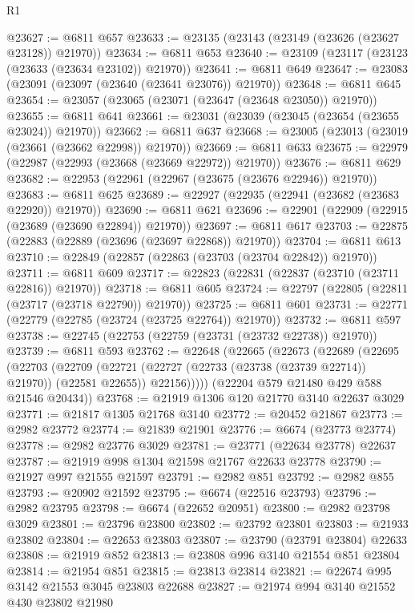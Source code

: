 \begin{lexlean}{R1}
\begin{coremodule}
@23627 := @6811 @657
@23633 := @23135 (@23143 (@23149 (@23626 (@23627 @23128)) @21970))
@23634 := @6811 @653
@23640 := @23109 (@23117 (@23123 (@23633 (@23634 @23102)) @21970))
@23641 := @6811 @649
@23647 := @23083 (@23091 (@23097 (@23640 (@23641 @23076)) @21970))
@23648 := @6811 @645
@23654 := @23057 (@23065 (@23071 (@23647 (@23648 @23050)) @21970))
@23655 := @6811 @641
@23661 := @23031 (@23039 (@23045 (@23654 (@23655 @23024)) @21970))
@23662 := @6811 @637
@23668 := @23005 (@23013 (@23019 (@23661 (@23662 @22998)) @21970))
@23669 := @6811 @633
@23675 := @22979 (@22987 (@22993 (@23668 (@23669 @22972)) @21970))
@23676 := @6811 @629
@23682 := @22953 (@22961 (@22967 (@23675 (@23676 @22946)) @21970))
@23683 := @6811 @625
@23689 := @22927 (@22935 (@22941 (@23682 (@23683 @22920)) @21970))
@23690 := @6811 @621
@23696 := @22901 (@22909 (@22915 (@23689 (@23690 @22894)) @21970))
@23697 := @6811 @617
@23703 := @22875 (@22883 (@22889 (@23696 (@23697 @22868)) @21970))
@23704 := @6811 @613
@23710 := @22849 (@22857 (@22863 (@23703 (@23704 @22842)) @21970))
@23711 := @6811 @609
@23717 := @22823 (@22831 (@22837 (@23710 (@23711 @22816)) @21970))
@23718 := @6811 @605
@23724 := @22797 (@22805 (@22811 (@23717 (@23718 @22790)) @21970))
@23725 := @6811 @601
@23731 := @22771 (@22779 (@22785 (@23724 (@23725 @22764)) @21970))
@23732 := @6811 @597
@23738 := @22745 (@22753 (@22759 (@23731 (@23732 @22738)) @21970))
@23739 := @6811 @593
@23762 := @22648
    (@22665
      (@22673
        (@22689
          (@22695
            (@22703
              (@22709
                (@22721 (@22727 (@22733 (@23738 (@23739 @22714)) @21970)) (@22581 @22655))
                @22156)))))
      (@22204 @579 @21480 @429 @588 @21546 @20434))
@23768 := @21919 @1306 @120 @21770 @3140 @22637 @3029
@23771 := @21817 @1305 @21768 @3140
@23772 := @20452 @21867
@23773 := @2982 @23772
@23774 := @21839 @21901
@23776 := @6674 (@23773 @23774)
@23778 := @2982 @23776 @3029
@23781 := @23771 (@22634 @23778) @22637
@23787 := @21919 @998 @1304 @21598 @21767 @22633 @23778
@23790 := @21927 @997 @21555 @21597
@23791 := @2982 @851
@23792 := @2982 @855
@23793 := @20902 @21592
@23795 := @6674 (@22516 @23793)
@23796 := @2982 @23795
@23798 := @6674 (@22652 @20951)
@23800 := @2982 @23798 @3029
@23801 := @23796 @23800
@23802 := @23792 @23801
@23803 := @21933 @23802
@23804 := @22653 @23803
@23807 := @23790 (@23791 @23804) @22633
@23808 := @21919 @852
@23813 := @23808 @996 @3140 @21554 @851 @23804
@23814 := @21954 @851
@23815 := @23813 @23814
@23821 := @22674 @995 @3142 @21553 @3045 @23803 @22688
@23827 := @21974 @994 @3140 @21552 @430 @23802 @21980

\end{coremodule}
\end{lexlean}
